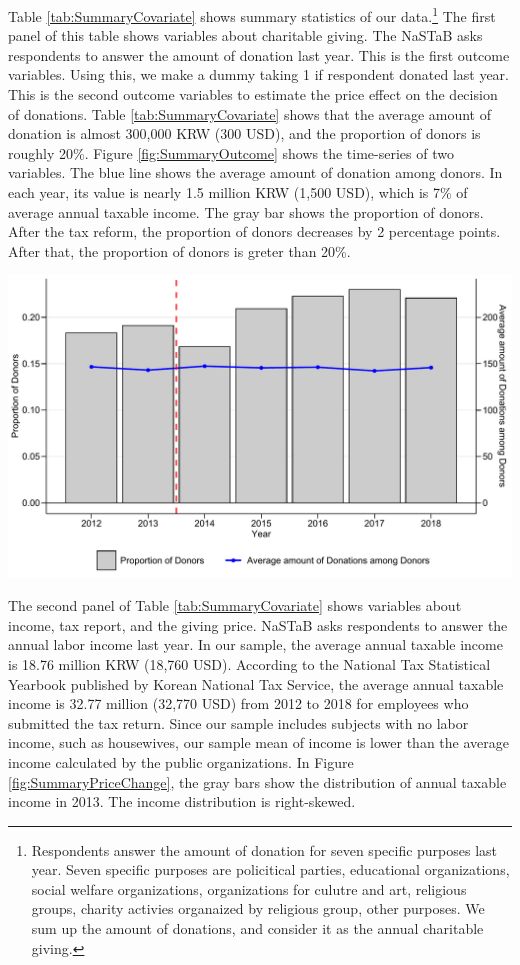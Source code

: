 \documentclass[
  11pt,
  a4paper,
]{article}
\begin{document}
Table \ref{tab:SummaryCovariate} shows summary statistics of our data.\footnote{Respondents answer the amount of donation for seven specific purposes last year. Seven specific purposes are policitical parties, educational organizations, social welfare organizations, organizations for culutre and art, religious groups, charity activies organaized by religious group, other purposes. We sum up the amount of donations, and consider it as the annual charitable giving.}
The first panel of this table shows variables about charitable giving.
The NaSTaB asks respondents to answer the amount of donation last year.
This is the first outcome variables.
Using this, we make a dummy taking 1 if respondent donated last year.
This is the second outcome variables to estimate the price effect on the decision of donations.
Table \ref{tab:SummaryCovariate} shows that
the average amount of donation is almost 300,000 KRW (300 USD),
and the proportion of donors is roughly 20\%.
Figure \ref{fig:SummaryOutcome} shows the time-series of two variables.
The blue line shows the average amount of donation among donors.
In each year, its value is nearly 1.5 million KRW (1,500 USD),
which is 7\% of average annual taxable income.
The gray bar shows the proportion of donors.
After the tax reform, the proportion of donors decreases by 2 percentage points.
After that, the proportion of donors is greter than 20\%.

\begin{center}\includegraphics[width=0.85\linewidth]{draft_files/figure-latex/SummaryOutcome-1} \end{center}

The second panel of Table \ref{tab:SummaryCovariate} shows variables about income, tax report, and the giving price.
NaSTaB asks respondents to answer the annual labor income last year.
In our sample, the average annual taxable income is 18.76 million KRW (18,760 USD).
According to the National Tax Statistical Yearbook published by Korean National Tax Service,
the average annual taxable income is 32.77 million (32,770 USD) from 2012 to 2018
for employees who submitted the tax return.
Since our sample includes subjects with no labor income, such as housewives,
our sample mean of income is lower than the average income calculated by the public organizations.
In Figure \ref{fig:SummaryPriceChange},
the gray bars show the distribution of annual taxable income in 2013.
The income distribution is right-skewed.
\end{document}
